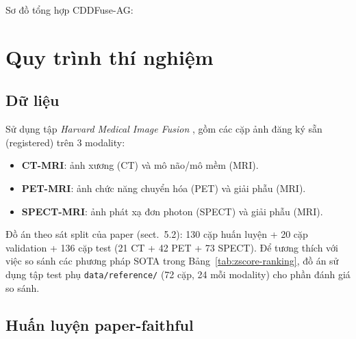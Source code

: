 Sơ đồ tổng hợp CDDFuse-AG:
\begin{center}
\end{center}

\section{Quy trình thí nghiệm}
\label{sec:procedure}

\subsection{Dữ liệu}
Sử dụng tập \emph{Harvard Medical Image Fusion} \cite{zhao2023cddfuse}, gồm các cặp ảnh đăng ký sẵn (registered) trên 3 modality:
\begin{itemize}\itemsep0pt
    \item \textbf{CT-MRI}: ảnh xương (CT) và mô não/mô mềm (MRI).
    \item \textbf{PET-MRI}: ảnh chức năng chuyển hóa (PET) và giải phẫu (MRI).
    \item \textbf{SPECT-MRI}: ảnh phát xạ đơn photon (SPECT) và giải phẫu (MRI).
\end{itemize}
Đồ án theo sát split của paper \cite{zhao2023cddfuse} (sect.~5.2): 130 cặp huấn luyện + 20 cặp validation + 136 cặp test (21 CT + 42 PET + 73 SPECT). Để tương thích với việc so sánh các phương pháp SOTA trong Bảng~\ref{tab:zscore-ranking}, đồ án sử dụng tập test phụ \texttt{data/reference/} (72 cặp, 24 mỗi modality) cho phần đánh giá so sánh.

\subsection{Huấn luyện paper-faithful}
\label{ssec:train-config}

